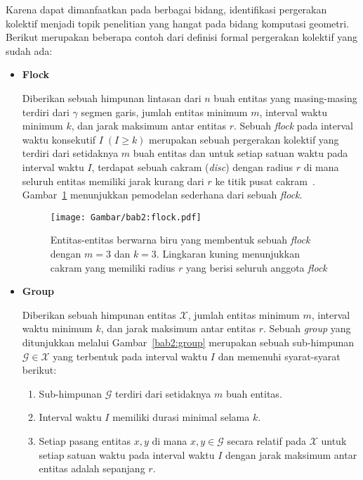 Karena dapat dimanfaatkan pada berbagai bidang, identifikasi pergerakan kolektif menjadi topik penelitian yang hangat pada bidang komputasi geometri. Berikut merupakan beberapa contoh dari definisi formal pergerakan kolektif yang sudah ada:

\begin{itemize}
    \item \textbf{Flock}
    
    Diberikan sebuah himpunan lintasan dari $n$ buah entitas yang masing-masing terdiri dari $\gamma$ segmen garis, jumlah entitas minimum $m$, interval waktu minimum $k$, dan jarak maksimum antar entitas $r$. Sebuah \textit{flock} pada interval waktu konsekutif $I\;(I \geq k)$ merupakan sebuah pergerakan kolektif yang terdiri dari setidaknya $m$ buah entitas dan untuk setiap satuan waktu pada interval waktu $I$, terdapat sebuah cakram (\textit{disc}) dengan radius $r$ di mana seluruh entitas memiliki jarak kurang dari $r$ ke titik pusat cakram~\cite{gudmundsson:flock}. Gambar~\ref{bab2:flock} menunjukkan pemodelan sederhana dari sebuah \textit{flock}.
    
    \begin{figure}[htbp]
        \centering
        \captionsetup{width=0.75\textwidth}
        \texttt{[image: Gambar/bab2:flock.pdf]}
        \caption[Sebuah \textit{flock}]{Entitas-entitas berwarna biru yang membentuk sebuah \textit{flock} dengan $m = 3$ dan $k = 3$. Lingkaran kuning menunjukkan cakram yang memiliki radius $r$ yang berisi seluruh anggota \textit{flock}}
        \label{bab2:flock}
    \end{figure}

    \item \textbf{Group}
    
    Diberikan sebuah himpunan entitas $\mathcal{X}$, jumlah entitas minimum $m$, interval waktu minimum $k$, dan jarak maksimum antar entitas $r$. Sebuah \textit{group} yang ditunjukkan melalui Gambar~\ref{bab2:group} merupakan sebuah sub-himpunan $\mathcal{G} \in \mathcal{X}$ yang terbentuk pada interval waktu $I$ dan memenuhi syarat-syarat berikut:
    
    \begin{enumerate}
        \item Sub-himpunan $\mathcal{G}$ terdiri dari setidaknya $m$ buah entitas.
        \item Interval waktu $I$ memiliki durasi minimal selama $k$.
        \item Setiap pasang entitas $x, y$ di mana $x, y \in \mathcal{G}$ secara relatif pada $\mathcal{X}$ untuk setiap satuan waktu pada interval waktu $I$ dengan jarak maksimum antar entitas adalah sepanjang $r$.
    \end{enumerate}
    

\end{itemize}
